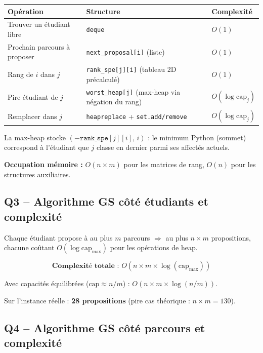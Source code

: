 \documentclass[11pt,a4paper]{article}
\begin{document}
\begin{center}
\begin{tabular}{lll}
\toprule
\textbf{Opération} & \textbf{Structure} & \textbf{Complexité} \\
\midrule
Trouver un étudiant libre & \texttt{deque} & $O(1)$ \\
Prochain parcours à proposer & \texttt{next\_proposal[i]} (liste) & $O(1)$ \\
Rang de $i$ dans $j$ & \texttt{rank\_spe[j][i]} (tableau 2D précalculé) & $O(1)$ \\
Pire étudiant de $j$ & \texttt{worst\_heap[j]} (max-heap via négation du rang) & $O(\log \mathrm{cap}_j)$ \\
Remplacer dans $j$ & \texttt{heapreplace} + \texttt{set.add/remove} & $O(\log \mathrm{cap}_j)$ \\
\bottomrule
\end{tabular}
\end{center}

La max-heap stocke $(-\texttt{rank\_spe}[j][i],\, i)$ : le minimum Python (sommet) correspond à l'étudiant que $j$ classe en dernier parmi ses affectés actuels.

\textbf{Occupation mémoire :} $O(n \times m)$ pour les matrices de rang, $O(n)$ pour les structures auxiliaires.

\subsection*{Q3 -- Algorithme GS côté étudiants et complexité}

Chaque étudiant propose à au plus $m$ parcours $\Rightarrow$ au plus $n \times m$ propositions, chacune coûtant $O(\log \mathrm{cap}_{\max})$ pour les opérations de heap.

\[
  \textbf{Complexité totale : } O(n \times m \times \log(\mathrm{cap}_{\max}))
\]

Avec capacités équilibrées ($\mathrm{cap} \approx n/m$) : $O(n \times m \times \log(n/m))$.

Sur l'instance réelle : \textbf{28 propositions} (pire cas théorique : $n \times m = 130$).

\subsection*{Q4 -- Algorithme GS côté parcours et complexité}
\end{document}
